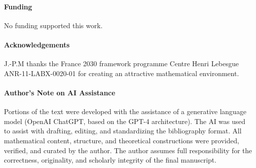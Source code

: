 \documentclass[11pt]{article}
\theoremstyle{definition}
\theoremstyle{remark}
\begin{document}
\vskip 12pt

\paragraph{\bf Funding} No funding supported this work.

\vskip 12pt

\paragraph{\bf Acknowledgements} J.-P.M thanks the France 2030 framework programme Centre Henri Lebesgue ANR-11-LABX-0020-01 
for creating an attractive mathematical environment.

\vskip 12pt

\paragraph{\bf Author's Note on AI Assistance}
Portions of the text were developed with the assistance of a generative language model (OpenAI ChatGPT, based on the GPT-4 architecture). The AI was used to assist with drafting, editing, and standardizing the bibliography format. All mathematical content, structure, and theoretical constructions were provided, verified, and curated by the author. The author assumes full responsibility for the correctness, originality, and scholarly integrity of the final manuscript.
\end{document}
